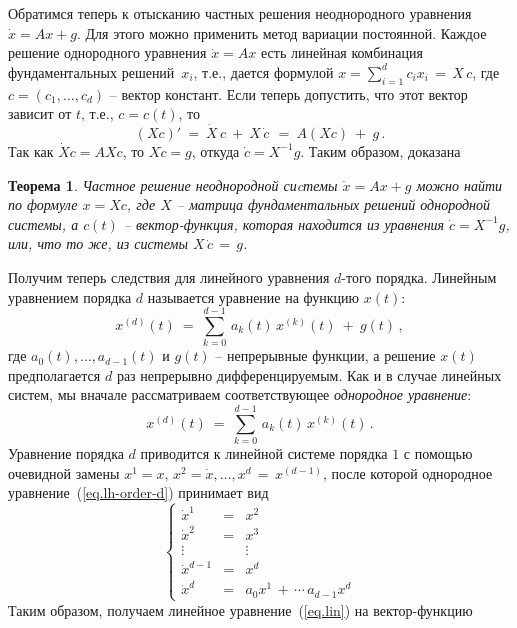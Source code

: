 \documentclass[12pt,a4paper]{article}
\newtheorem{theorem}{Теорема}
\begin{document}
Обратимся теперь к отысканию частных решения неоднородного уравнения
$\dot x = A x + g$. Для этого  можно применить метод вариации постоянной.
Каждое решение однородного уравнения $\dot x = Ax$ есть линейная комбинация фундаментальных решений~$x_i$, т.е., дается формулой
$x = \sum_{i=1}^d c_i x_i \, = \, X\, c$,
где $c = (c_1, \ldots , c_d)$ -- вектор констант.
Если теперь допустить, что этот вектор зависит от $t$, т.е., $c = c(t)$, то
$$
(Xc)' \ =\ \dot X \, c \ + \ X \, \dot c\, \ = \ A(Xc)\ + \ g\, .
$$
Так как $\dot X c = AXc$, то $X \dot c = g$, откуда $\dot c = X^{-1}g$.
Таким образом, доказана
\begin{theorem}\label{th.lin-nonh}
Частное решение неоднородной сиcтемы $\dot x = Ax + g$ можно найти по формуле
$x = Xc$, где $X$ -- матрица фундаментальных решений однородной системы, а $c(t)$ -- вектор-функция, которая
находится  из уравнения $\dot c = X^{-1}g$, или, что то же, из системы $X \, \dot c \, = \, g$.
\end{theorem}
Получим теперь следствия для линейного уравнения $d$-того порядка. Линейным уравнением порядка
$d$ называется уравнение на функцию $x(t)$:
\begin{equation}\label{eq.l-order-d}
x^{(d)}(t) \ = \ \sum_{k=0}^{d-1} \, a_k(t)\, x^{(k)}(t) \ + \ g(t)\, ,
\end{equation}
где $a_0(t), \ldots , a_{d-1}(t)$ и $g(t)$ -- непрерывные функции, а решение
$x(t)$ предполагается $d$ раз непрерывно дифференцируемым. Как и в случае линейных
систем, мы вначале рассматриваем соответствующее {\em однородное уравнение}:
\begin{equation}\label{eq.lh-order-d}
x^{(d)}(t) \ = \  \sum_{k=0}^{d-1} \, a_k(t)\, x^{(k)}(t)\, .
\end{equation}
Уравнение порядка $d$ приводится к линейной системе порядка $1$ с помощью
очевидной замены $x^1 = x, \, x^2 = \dot x , \ldots , x^d \, = \, x^{(d-1)}$,
после которой однородное уравнение~(\ref{eq.lh-order-d}) принимает вид
\begin{equation}\label{eq.lh-syst-d}
\left\{
\begin{array}{lcl}
\dot x^1 & = & x^2\\
\dot x^2 & = & x^3\\
\vdots & {} & \vdots \\
\dot x^{d - 1} & = & x^{d}\\
\dot x^{d} & = & a_0x^{1} \, + \, \cdots \, a_{d-1}x^{d}
\end{array}
\right.
\end{equation}
Таким образом, получаем линейное уравнение~(\ref{eq.lin})  на вектор-функцию
\end{document}
